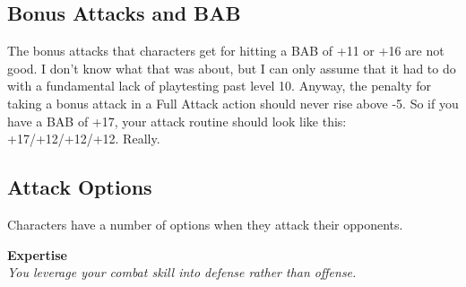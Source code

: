 



\subsection{Bonus Attacks and BAB}

The bonus attacks that characters get for hitting a BAB of +11 or +16 are not good. I don't know what that was about, but I can only assume that it had to do with a fundamental lack of playtesting past level 10. Anyway, the penalty for taking a bonus attack in a Full Attack action should never rise above -5. So if you have a BAB of +17, your attack routine should look like this: +17/+12/+12/+12. Really.

\subsection{Attack Options}

Characters have a number of options when they attack their opponents.

\listone\hypertarget{combat:expertise}{}
\item \textbf{{Expertise}}\\
\emph{You leverage your combat skill into defense rather than offense.}\\
\\

